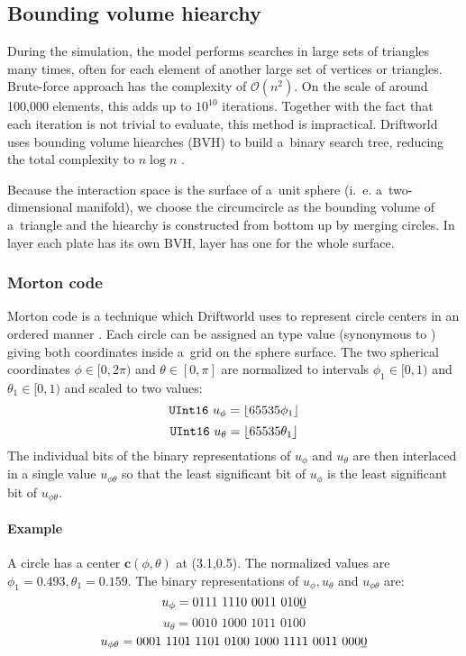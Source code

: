 \subsection{Bounding volume hiearchy}
\label{subsec:bvh}
During the simulation, the model performs searches in large sets of triangles many times, often for each element of another large set of vertices or triangles. Brute-force approach has the complexity of $\mathcal{O}(n^2)$. On the scale of around 100,000 elements, this adds up to $10^{10}$ iterations. Together with the fact that each iteration is not trivial to evaluate, this method is impractical. Driftworld uses bounding volume hiearches (BVH) to build a~binary search tree, reducing the total complexity to $n\log n$ \cite{sulaiman}\cite{bvharticle}.

Because the interaction space is the surface of a~unit sphere (i.~e. a~two-dimensional manifold), we choose the circumcircle as the bounding volume of a~triangle and the hiearchy is constructed from bottom up by merging circles. In  layer each plate has its own BVH,  layer has one for the whole surface.
\subsubsection{Morton code}
Morton code is a technique which Driftworld uses to represent circle centers in an ordered manner \cite{morton}. Each circle can be assigned an  type value (synonymous to ) giving both coordinates inside a~grid on the sphere surface. The two spherical coordinates $\phi\in[0,2\pi)$ and $\theta\in[0,\pi]$ are normalized to intervals $\phi_1\in[0,1)$ and $\theta_1\in[0,1)$ and scaled to two  values:
$$\mbox{\texttt{UInt16} }u_\phi=\lfloor 65535\phi_1\rfloor$$
$$\mbox{\texttt{UInt16} }u_\theta=\lfloor 65535\theta_1\rfloor$$
The individual bits of the binary representations of $u_\phi$ and $u_\theta$ are then interlaced in a single  value $u_{\phi\theta}$ so that the least significant bit of $u_\phi$ is the least significant bit of $u_{\phi\theta}$.

\paragraph{Example} A circle has a center $\mathbf{c}(\phi,\theta)$ at (3.1,0.5). The normalized values are $\phi_1=0.493,\theta_1=0.159$. The binary representations of $u_\phi, u_\theta$ and $u_{\phi\theta}$ are:
$$u_\phi=\mbox{0111 1110 0011 010\underline{0}}$$
$$u_\theta=\mbox{0010 1000 1011 0100}$$
$$u_{\phi\theta}=\mbox{0001 1101 1101 0100 1000 1111 0011 000\underline{0}}$$
